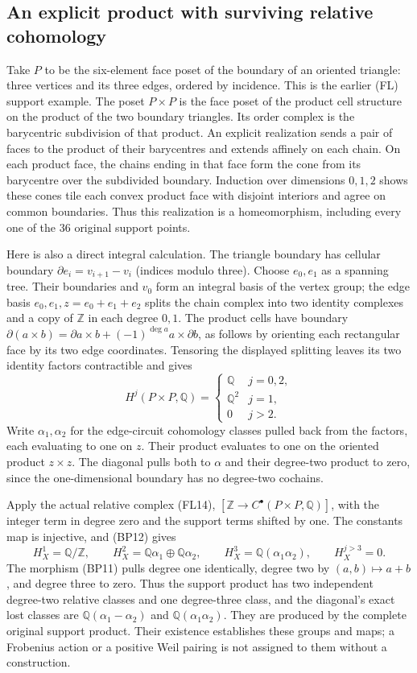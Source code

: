 \subsection{An explicit product with surviving relative cohomology}

Take $P$ to be the six-element face poset of the boundary of an
oriented triangle: three vertices and its three edges, ordered by
incidence. This is the earlier (FL) support example. The poset
$P\times P$ is the face poset of the product cell structure on
the product of the two boundary triangles. Its order complex is
the barycentric subdivision of that product. An explicit realization
sends a pair of faces to the product of their barycentres and extends
affinely on each chain. On each product face, the chains ending in
that face form the cone from its barycentre over the subdivided
boundary. Induction over dimensions $0,1,2$ shows these cones tile
each convex product face with disjoint interiors and agree on common
boundaries. Thus this realization is a homeomorphism, including every
one of the $36$ original support points.

Here is also a direct integral calculation. The triangle boundary
has cellular boundary $\partial e_i=v_{i+1}-v_i$ (indices modulo
three). Choose $e_0,e_1$ as a spanning tree. Their boundaries and
$v_0$ form an integral basis of the vertex group; the edge basis
$e_0,e_1,z=e_0+e_1+e_2$ splits the chain complex into two identity
complexes and a copy of $\mathbb Z$ in each degree $0,1$.
The product cells have boundary
$\partial(a\times b)=\partial a\times b+(-1)^{\deg a}a\times\partial b$,
as follows by orienting each rectangular face by its two edge
coordinates. Tensoring the displayed splitting leaves its two
identity factors contractible and gives
\[
 H^j(P\times P,\mathbb Q)=
 \begin{cases}\mathbb Q&j=0,2,\\\mathbb Q^2&j=1,\\0&j>2.\end{cases}
 \tag{BP12}
\]
Write $\alpha_1,\alpha_2$ for the edge-circuit cohomology classes
pulled back from the factors, each evaluating to one on $z$.
Their product evaluates to one on the oriented product $z\times z$.
The diagonal pulls both to $\alpha$ and their degree-two product to
zero, since the one-dimensional boundary has no degree-two cochains.

Apply the actual relative complex (FL14),
$[\mathbb Z\to C^\bullet(P\times P,\mathbb Q)]$, with the
integer term in degree zero and the support terms shifted by one.
The constants map is injective, and (BP12) gives
\[
 H_X^1=\mathbb Q/\mathbb Z,\qquad
 H_X^2=\mathbb Q\alpha_1\oplus\mathbb Q\alpha_2,\qquad
 H_X^3=\mathbb Q(\alpha_1\alpha_2),\qquad H_X^{j>3}=0.
 \tag{BP13}
\]
The morphism (BP11) pulls degree one identically, degree two by
$(a,b)\mapsto a+b$, and degree three to zero. Thus the support
product has two independent degree-two relative classes and one
degree-three class, and the diagonal's exact lost classes are
$\mathbb Q(\alpha_1-\alpha_2)$ and $\mathbb Q(\alpha_1\alpha_2)$.
They are produced by the complete original support product. Their
existence establishes these groups and maps; a Frobenius action or
a positive Weil pairing is not assigned to them without a construction.

